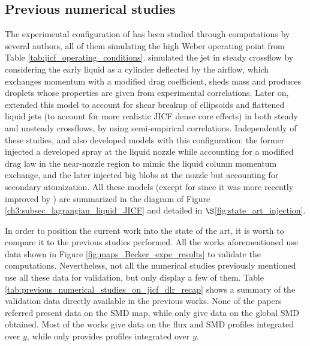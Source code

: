 \subsection{Previous numerical studies}
\label{ch6:previous_numerical_studies}

The experimental configuration of  has been studied through computations by several authors, all of them simulating the high Weber operating point from Table \ref{tab:jicf_operating_conditions}.  simulated the jet in steady crossflow by considering the early liquid as a cylinder deflected by the airflow, which exchanges momentum with a modified drag coefficient, sheds mass and produces droplets whose properties are given from experimental correlations. Later on,  extended this model to account for shear breakup of ellipsoids and flattened liquid jets (to account for more realistic JICF dense core effects) in both steady and unsteady crossflows, by using semi-empirical correlations. Independently of these studies,  and  also developed models with this configuration: the former injected a developed spray at the liquid nozzle while accounting for a modified drag law in the near-nozzle region to mimic the liquid column momentum exchange, and the later injected big blobs at the nozzle but accounting for secondary atomization. All these models (except for
 since it was more recently improved by ) are summarized in the diagram of Figure \ref{ch3:subsec_lagrangian_liquid_JICF} and detailed in $\S$\ref{fig:state_art_injection}.

In order to position the current work into the state of the art, it is worth to compare it to the previous studies performed. All the works aforementioned use data shown in Figure \ref{fig:maps_Becker_expe_results} to validate the computations. Nevertheless, not all the numerical studies previously mentioned use all these data for validation, but only display a few of them. Table \ref{tab:previous_numerical_studies_on_jicf_dlr_recap} shows a summary of the validation data directly available in the previous works. None of the papers referred present data on the SMD map, while only  give data on the global SMD obtained. Most of the works give data on the flux and SMD profiles integrated over $y$, while only  provides profiles integrated over $y$. %

